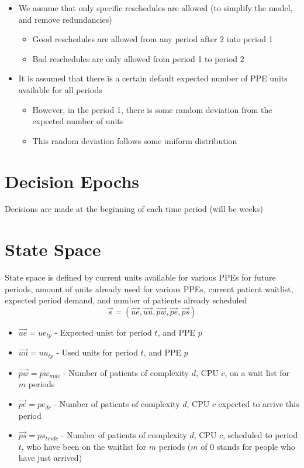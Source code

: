 \documentclass{article}
\begin{document}
\begin{itemize}
	\item We assume that only specific reschedules are allowed (to simplify the model, and remove  redundancies)
		\begin{itemize}
			\item Good reschedules are allowed from any period after 2 into period 1
			\item Bad reschedules are only allowed from period 1 to period 2
		\end{itemize}
	
	\item It is assumed that there is a certain default expected number of PPE units available for all periods
		\begin{itemize}
			\item However, in the period 1, there is some random deviation from the expected number of units
			\item This random deviation follows some uniform distribution
		\end{itemize}
\end{itemize}

\section{Decision Epochs}
Decisions are made at the beginning of each time period (will be weeks)

\section{State Space}
State space is defined by current units available for various PPEs for future periods, amount of units already used for various PPEs, current patient waitlist, expected period demand, and number of patients already scheduled
\[ \vec{s}  = (\vec{ue}, \vec{uu}, \vec{pw}, \vec{pe}, \vec{ps})\]
\begin{itemize}
    \item $\vec{ue} = ue_{tp}$ - Expected unist for period $t$, and PPE $p$
    \item $\vec{uu} = uu_{tp}$ - Used units for period $t$, and PPE $p$
    \item $\vec{pw} = pw_{mdc}$ - Number of patients of complexity $d$, CPU $c$, on a wait list for $m$ periods
    \item $\vec{pe} = pe_{dc}$ - Number of patients of complexity $d$, CPU $c$ expected to arrive this period
    \item $\vec{ps} = ps_{tmdc}$ - Number of patients of complexity $d$, CPU $c$, scheduled to period $t$, who have been on the waitlist for $m$ periods ($m$ of 0 stands for people who have just arrived)
\end{itemize}
\end{document}
